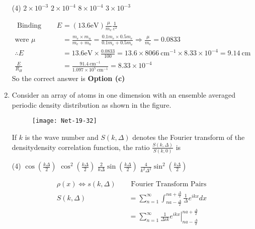 \begin{enumerate}
 \begin{tasks}(4)
	\task[\textbf{a.}]$2 \times 10^{-3}$
	\task[\textbf{b.}]$2 \times 10^{-4}$
	\task[\textbf{c.}]$8 \times 10^{-4}$
	\task[\textbf{d.}]$3 \times 10^{-3}$ 
\end{tasks}
\begin{answer}
	\begin{align*}
	\text { Binding energy of exciton is } E&=(13.6 \mathrm{eV}) \frac{\mu}{m_{e}} \frac{1}{\varepsilon^{2}}\\
\text{were }
	\mu&=\frac{m_{e} \times m_{n}}{m_{e}+m_{n}}=\frac{0.1 m_{e} \times 0.5 m_{e}}{0.1 m_{e}+0.5 m_{e}} \Rightarrow \frac{\mu}{m_{e}}=0.0833\\
	\therefore E&=13.6 \mathrm{eV} \times \frac{0.0833}{100}=13.6 \times 8066 \mathrm{~cm}^{-1} \times 8.33 \times 10^{-4}=9.14 \mathrm{~cm}\\
	\frac{E}{R_{H}}&=\frac{91.4 \mathrm{~cm}^{-1}}{1.097 \times 10^{5} \mathrm{~cm}^{-1}}=8.33 \times 10^{-4}
	\end{align*}
		So the correct answer is \textbf{Option (c)}
\end{answer}
\item Consider an array of atoms in one dimension with an ensemble averaged periodic density distribution as shown in the figure.
\begin{figure}[H]
	\centering
	\texttt{[image: Net-19-32]}
\end{figure}
If $k$ is the wave number and $S(k, \Delta)$ denotes the Fourier transform of the densitydensity correlation function, the ratio $\frac{S(k, \Delta)}{S(k, 0)}$ is
 \begin{tasks}(4)
	\task[\textbf{a.}] $\cos \left(\frac{k \Delta}{2}\right)$
	\task[\textbf{b.}] $\cos ^{2}\left(\frac{k \Delta}{2}\right)$
	\task[\textbf{c.}] $\frac{2}{k \Delta} \sin \left(\frac{k \Delta}{2}\right)$
	\task[\textbf{d.}] $\frac{4}{k^{2} \Delta^{2}} \sin ^{2}\left(\frac{k \Delta}{2}\right)$
\end{tasks}
\begin{answer}
	\begin{align*}
	\rho(x) \Leftrightarrow s(k, \Delta) \quad& \text { Fourier Transform Pairs }\\
	S(k, \Delta)&=\sum_{n=1}^{\infty} \int_{n a-\frac{\Delta}{2}}^{n a+\frac{\Delta}{2}} \frac{1}{\Delta} e^{i k x} d x \\
	&=\left.\sum_{n=1}^{\infty} \frac{1}{\Delta i k} e^{i k x}\right|_{n a-\frac{\Delta}{2}} ^{n a+\frac{\Delta}{2}}\\

\end{align*}
\end{answer}
\end{enumerate}
